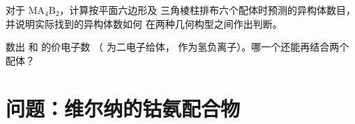 \begin{exercise}[$\star\star\star$]\label{exo:b2:coordination-complexes:11}
对于 $\mathrm{MA_4B_2}$，计算按平面六边形及
三角棱柱排布六个配体时预测的异构体数目，并说明实际找到的异构体数如何
在两种几何构型之间作出判断。
\end{exercise}

\begin{exercise}[$\star\star\star$]\label{exo:b2:coordination-complexes:12}
数出  和  的价电子数
（ 为二电子给体， 作为氢负离子）。哪一个还能再结合两个
配体？
\end{exercise}

\section{问题：维尔纳的钴氨配合物}

